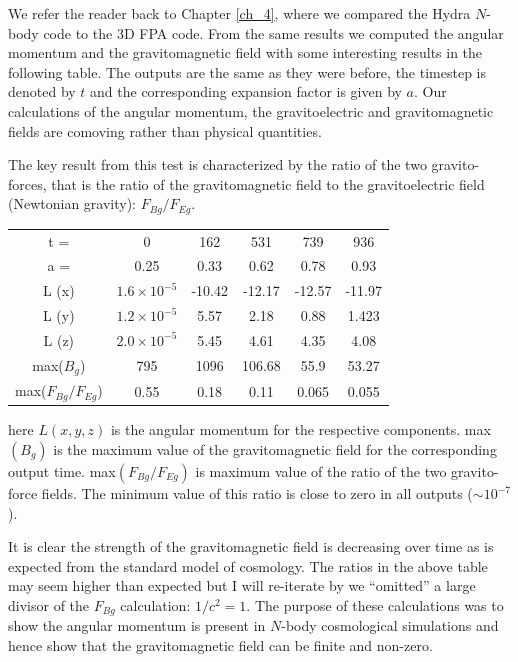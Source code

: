 We refer the reader back to Chapter \ref{ch_4}, where we compared the Hydra $N$-body code to the 3D FPA code. From the same results we computed the angular momentum and the gravitomagnetic field with some interesting results in the following table. The outputs are the same as they were before, the timestep is denoted by $t$ and the corresponding expansion factor is given by $a$. Our calculations of the angular momentum, the gravitoelectric and gravitomagnetic fields are comoving rather than physical quantities.

The key result from this test is characterized by the ratio of the two gravito-forces, that is the ratio of the gravitomagnetic field to the gravitoelectric field (Newtonian gravity): $F_{Bg}/F_{Eg}$.

\vspace*{1cm}
\begin{center}
\begin{tabular}{|c|c|c|c|c|c|}
  \hline
  t = & 0 & 162 & 531 & 739 & 936 \\
  a = & 0.25 & 0.33 & 0.62 & 0.78 & 0.93 \\  \hline
  L (x) & $1.6\times 10^{-5}$&-10.42 & -12.17&-12.57& -11.97 \\
  L (y) & $1.2\times 10^{-5}$& 5.57  &  2.18 & 0.88 & 1.423  \\
  L (z) & $2.0\times 10^{-5}$  & 5.45  &  4.61 & 4.35 & 4.08 \\ \hline
  max($B_g$) & 795 & 1096 & 106.68 & 55.9 & 53.27 \\
  max($F_{Bg}/F_{Eg}$) & 0.55 & 0.18 & 0.11 & 0.065 & 0.055 \\
  \hline
\end{tabular}
\end{center}
\vspace*{1cm}

\noindent here $L(x,y,z)$ is the angular momentum for the respective components. max$(B_g)$ is the maximum value of the gravitomagnetic field for the corresponding output time. max$(F_{Bg}/F_{Eg})$ is maximum value of the ratio of the two gravito-force fields. The minimum value of this ratio is close to zero in all outputs ($\sim 10^{-7}$). 

It is clear the strength of the gravitomagnetic field is decreasing over time as is expected from the standard model of cosmology. The ratios in the above table may seem higher than expected but I will re-iterate by we ``omitted'' a large divisor of the $F_{Bg}$ calculation: $1/c^2 = 1$. The purpose of these calculations was to show the angular momentum is present in $N$-body cosmological simulations and hence show that the gravitomagnetic field can be finite and non-zero.


